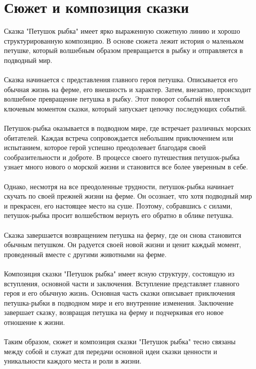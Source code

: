 \documentclass{article}
\begin{document}
\section{Сюжет и композиция сказки}
Сказка "{}Петушок рыбка"{} имеет ярко выраженную сюжетную линию и хорошо структурированную композицию. В основе сюжета лежит история о маленьком петушке, который волшебным образом превращается в рыбку и отправляется в подводный мир.\\
~\\
Сказка начинается с представления главного героя  петушка. Описывается его обычная жизнь на ферме, его внешность и характер. Затем, внезапно, происходит волшебное превращение петушка в рыбку. Этот поворот событий является ключевым моментом сказки, который запускает цепочку последующих событий.\\
~\\
Петушок-рыбка оказывается в подводном мире, где встречает различных морских обитателей. Каждая встреча сопровождается небольшим приключением или испытанием, которое герой успешно преодолевает благодаря своей сообразительности и доброте. В процессе своего путешествия петушок-рыбка узнает много нового о морской жизни и становится все более уверенным в себе.\\
~\\
Однако, несмотря на все преодоленные трудности, петушок-рыбка начинает скучать по своей прежней жизни на ферме. Он осознает, что хотя подводный мир и прекрасен, его настоящее место  на суше. Поэтому, собравшись с силами, петушок-рыбка просит волшебством вернуть его обратно в облике петушка.\\
~\\
Сказка завершается возвращением петушка на ферму, где он снова становится обычным петушком. Он радуется своей новой жизни и ценит каждый момент, проведенный вместе с другими животными на ферме.\\
~\\
Композиция сказки "{}Петушок рыбка"{} имеет ясную структуру, состоящую из вступления, основной части и заключения. Вступление представляет главного героя и его обычную жизнь. Основная часть сказки описывает приключения петушка-рыбки в подводном мире и его внутренние изменения. Заключение завершает сказку, возвращая петушка на ферму и подчеркивая его новое отношение к жизни.\\
~\\
Таким образом, сюжет и композиция сказки "{}Петушок рыбка"{} тесно связаны между собой и служат для передачи основной идеи сказки  ценности и уникальности каждого места и роли в жизни.
\end{document}
